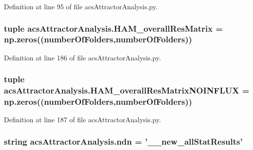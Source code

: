 Definition at line 95 of file acs\-Attractor\-Analysis.\-py.

\hypertarget{a00122_a46dc8cdfb545b64952370e51ff02336f}{
\subsubsection[{H\-A\-M\-\_\-overall\-Res\-Matrix}]{\setlength{\rightskip}{0pt plus 5cm}tuple acs\-Attractor\-Analysis.\-H\-A\-M\-\_\-overall\-Res\-Matrix = np.\-zeros(({\bf number\-Of\-Folders},{\bf number\-Of\-Folders}))}}\label{a00122_a46dc8cdfb545b64952370e51ff02336f}


Definition at line 186 of file acs\-Attractor\-Analysis.\-py.

\hypertarget{a00122_a9aa1adb46370d97e4f38e7f09eb7a97c}{
\subsubsection[{H\-A\-M\-\_\-overall\-Res\-Matrix\-N\-O\-I\-N\-F\-L\-U\-X}]{\setlength{\rightskip}{0pt plus 5cm}tuple acs\-Attractor\-Analysis.\-H\-A\-M\-\_\-overall\-Res\-Matrix\-N\-O\-I\-N\-F\-L\-U\-X = np.\-zeros(({\bf number\-Of\-Folders},{\bf number\-Of\-Folders}))}}\label{a00122_a9aa1adb46370d97e4f38e7f09eb7a97c}


Definition at line 187 of file acs\-Attractor\-Analysis.\-py.

\hypertarget{a00122_a109ce3a379d650b3f9b08debc0433a19}{
\subsubsection[{ndn}]{\setlength{\rightskip}{0pt plus 5cm}string acs\-Attractor\-Analysis.\-ndn = '\-\_\-\_\-new\-\_\-all\-Stat\-Results'}}\label{a00122_a109ce3a379d650b3f9b08debc0433a19}


